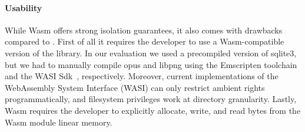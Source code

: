 \paragraph{Usability}
%
While Wasm offers strong isolation guarantees, it also comes with drawbacks compared to \pap. First of all it requires the developer
to use a Wasm-compatible version of the library. In our evaluation we
used a precompiled version of sqlite3, but we had to manually compile
opus and libpng using the Emscripten toolchain~\cite{emscripten} and
the WASI Sdk~\cite{wasi-sdk}, respectively. Moreover, current implementations of the WebAssembly
System Interface (WASI) can only restrict ambient rights
programmatically, and filesystem privileges work at
directory granularity. Lastly, Wasm requires the developer to
explicitly allocate, write, and read bytes from the Wasm module linear
memory.



